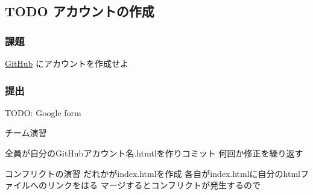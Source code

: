 \documentclass[a4paper,twoside,twocolumn]{bxjsarticle}
\begin{document}
\subsection{{\bfseries\sffamily TODO} アカウントの作成}
\label{sec-3-1}
\subsubsection{課題}
\label{sec-3-1-1}
\href{https://github.com/}{GitHub} にアカウントを作成せよ
\subsubsection{提出}
\label{sec-3-1-2}
TODO: Google form

チーム演習

全員が自分のGitHubアカウント名.htmtlを作りコミット
何回か修正を繰り返す

コンフリクトの演習
だれかがindex.htmlを作成
各自がindex.htmlに自分のhtmlファイルへのリンクをはる
マージするとコンフリクトが発生するので
\end{document}
